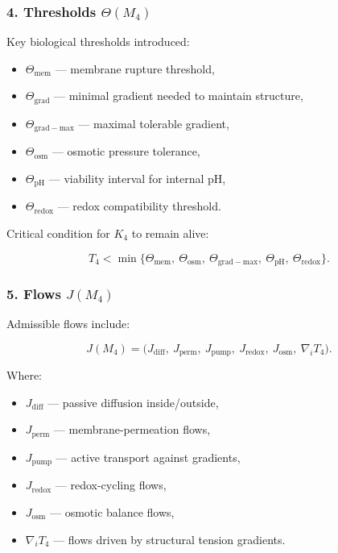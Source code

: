 \subsubsection*{4. Thresholds \texorpdfstring{$\Theta(M_4)$}{\Theta(M_4)}}

Key biological thresholds introduced:

\begin{itemize}
    \item $\Theta_{\mathrm{mem}}$ — membrane rupture threshold,
    \item $\Theta_{\mathrm{grad}}$ — minimal gradient needed to maintain structure,
    \item $\Theta_{\mathrm{grad-max}}$ — maximal tolerable gradient,
    \item $\Theta_{\mathrm{osm}}$ — osmotic pressure tolerance,
    \item $\Theta_{\mathrm{pH}}$ — viability interval for internal pH,
    \item $\Theta_{\mathrm{redox}}$ — redox compatibility threshold.
\end{itemize}

Critical condition for $K_4$ to remain alive:

\[
T_4 <
\min\{
\Theta_{\mathrm{mem}},\
\Theta_{\mathrm{osm}},\
\Theta_{\mathrm{grad-max}},\
\Theta_{\mathrm{pH}},\
\Theta_{\mathrm{redox}}
\}.
\]

\subsubsection*{5. Flows \texorpdfstring{$J(M_4)$}{J(M_4)}}

Admissible flows include:

\[
J(M_4)
=
\big(
J_{\mathrm{diff}},\
J_{\mathrm{perm}},\
J_{\mathrm{pump}},\
J_{\mathrm{redox}},\
J_{\mathrm{osm}},\
\nabla_i T_4
\big).
\]

Where:

\begin{itemize}
    \item $J_{\mathrm{diff}}$ — passive diffusion inside/outside,
    \item $J_{\mathrm{perm}}$ — membrane-permeation flows,
    \item $J_{\mathrm{pump}}$ — active transport against gradients,
    \item $J_{\mathrm{redox}}$ — redox-cycling flows,
    \item $J_{\mathrm{osm}}$ — osmotic balance flows,
    \item $\nabla_i T_4$ — flows driven by structural tension gradients.
\end{itemize}

